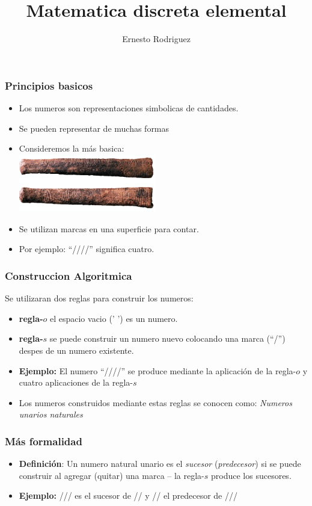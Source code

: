 \documentclass{beamer}
\title[Matematica discreta]{Matematica discreta elemental}
\author{Ernesto Rodriguez}
\institute{
    Universidad del Itsmo \\
    \medskip \textit{erodriguez@unis.edu.gt}
}
\date[\today]{}
\begin{document}
\begin{frame}
\titlepage
\end{frame}

\begin{frame}
\frametitle{Principios basicos}
\begin{itemize}
    \item{Los numeros son representaciones simbolicas de cantidades.}
    \item{Se pueden representar de muchas formas}
    \item{Consideremos la m\'as basica:\\
        \includegraphics[width=6cm]{numbers.png}
    }
    \item{Se utilizan marcas en una superficie para contar.}
    \item{Por ejemplo: ``////'' significa cuatro.}
\end{itemize}
\end{frame}

\begin{frame}
    \frametitle{Construccion Algoritmica}
    Se utilizaran dos reglas para construir los numeros:
    \begin{itemize}
        \item{{\bf regla-$o$} el espacio vacio (' ') es un numero.}
        \item{{\bf regla-$s$} se puede construir un numero nuevo colocando una marca
        (``/'') despes de un numero existente.}
        \item{{\bf Ejemplo:} El numero ``////'' se produce mediante la aplicaci\'on de la
        regla-$o$ y cuatro aplicaciones de la regla-$s$}
        \item{Los numeros construidos mediante estas reglas se conocen como: \emph{Numeros unarios naturales}}
    \end{itemize}
\end{frame}

\begin{frame}
\frametitle{M\'as formalidad}
\begin{itemize}
    \item{{\bf Definici\'on}: Un numero natural unario es el \emph{sucesor} (\emph{predecesor})
    si se puede construir al agregar (quitar) una marca -- la regla-$s$ produce los sucesores.}
    \item{{\bf Ejemplo:} /// es el sucesor de // y // el predecesor de ///}
\end{itemize}
\end{frame}
\end{document}
